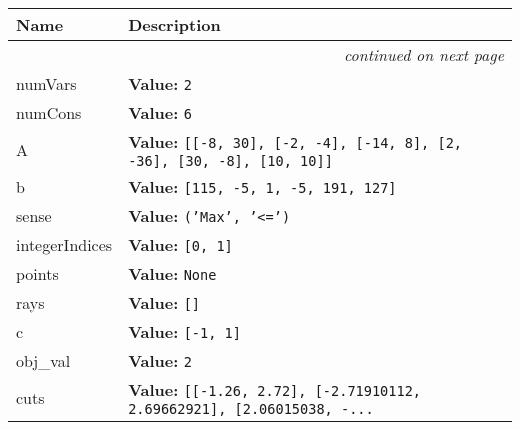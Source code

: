     \vspace{-1cm}
\hspace{\varindent}\begin{longtable}{|p{\varnamewidth}|p{\vardescrwidth}|l}
\cline{1-2}
\cline{1-2} \centering \textbf{Name} & \centering \textbf{Description}& \\
\cline{1-2}
\endhead\cline{1-2}\multicolumn{3}{r}{\small\textit{continued on next page}}\\\endfoot\cline{1-2}
\endlastfoot\raggedright n\-u\-m\-V\-a\-r\-s\- & \raggedright \textbf{Value:} 
{\tt 2}&\\
\cline{1-2}
\raggedright n\-u\-m\-C\-o\-n\-s\- & \raggedright \textbf{Value:} 
{\tt 6}&\\
\cline{1-2}
\raggedright A\- & \raggedright \textbf{Value:} 
{\tt \texttt{[}\texttt{[}-8\texttt{, }30\texttt{]}\texttt{, }\texttt{[}-2\texttt{, }-4\texttt{]}\texttt{, }\texttt{[}-14\texttt{, }8\texttt{]}\texttt{, }\texttt{[}2\texttt{, }-36\texttt{]}\texttt{, }\texttt{[}30\texttt{, }-8\texttt{]}\texttt{, }\texttt{[}10\texttt{, }10\texttt{]}\texttt{]}}&\\
\cline{1-2}
\raggedright b\- & \raggedright \textbf{Value:} 
{\tt \texttt{[}115\texttt{, }-5\texttt{, }1\texttt{, }-5\texttt{, }191\texttt{, }127\texttt{]}}&\\
\cline{1-2}
\raggedright s\-e\-n\-s\-e\- & \raggedright \textbf{Value:} 
{\tt \texttt{(}\texttt{'}\texttt{Max}\texttt{'}\texttt{, }\texttt{'}\texttt{{\textless}=}\texttt{'}\texttt{)}}&\\
\cline{1-2}
\raggedright i\-n\-t\-e\-g\-e\-r\-I\-n\-d\-i\-c\-e\-s\- & \raggedright \textbf{Value:} 
{\tt \texttt{[}0\texttt{, }1\texttt{]}}&\\
\cline{1-2}
\raggedright p\-o\-i\-n\-t\-s\- & \raggedright \textbf{Value:} 
{\tt None}&\\
\cline{1-2}
\raggedright r\-a\-y\-s\- & \raggedright \textbf{Value:} 
{\tt \texttt{[}\texttt{]}}&\\
\cline{1-2}
\raggedright c\- & \raggedright \textbf{Value:} 
{\tt \texttt{[}-1\texttt{, }1\texttt{]}}&\\
\cline{1-2}
\raggedright o\-b\-j\-\_\-v\-a\-l\- & \raggedright \textbf{Value:} 
{\tt 2}&\\
\cline{1-2}
\raggedright c\-u\-t\-s\- & \raggedright \textbf{Value:} 
{\tt \texttt{[}\texttt{[}-1.26\texttt{, }2.72\texttt{]}\texttt{, }\texttt{[}-2.71910112\texttt{, }2.69662921\texttt{]}\texttt{, }\texttt{[}2.06015038\texttt{, }-\texttt{...}}&\\
\cline{1-2}

\end{longtable}
